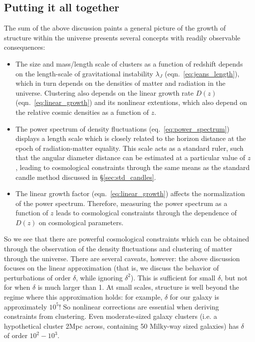 \subsection{Putting it all together}
The sum of the above discussion paints a general picture of the growth of
structure within the universe presents several concepts with readily
observable consequences:

\begin{itemize}
  \item The size and mass/length scale of clusters as a function of redshift
    depends on the length-scale of gravitational instability $\lambda_J$
    (eqn.~\ref{eq:jeans_length}),
    which in turn depends on the densities of matter and radiation in the
    universe.  Clustering also depends on the linear growth rate
    $D(z)$ (eqn.~\ref{eq:linear_growth}) and its nonlinear extentions,
    which also depend on the relative cosmic densities as a function of $z$.
  \item The power spectrum of density fluctuations (eq.~\ref{eq:power_spectrum})
    displays a length scale which is closely related to the horizon distance
    at the epoch of radiation-matter equality.  This scale acts as a standard
    ruler, such that the angular diameter distance can be estimated at a
    particular value of $z$, leading to cosmological constraints through the
    same means as the standard candle method discussed in
    \S\ref{sec:std_candles}.
  \item The linear growth factor (eqn.~\ref{eq:linear_growth}) affects the
    normalization of the power spectrum.  Therefore, measuring the power
    spectrum as a function of $z$ leads to cosmological constraints
    through the dependence of $D(z)$ on cosmological parameters.
\end{itemize}

So we see that there are powerful cosmological constraints which can be
obtained through the observation of the density fluctuations and clustering
of matter through the universe.  There are several caveats, however:
the above discussion focuses on the linear approximation (that is, we
discuss the behavior of perturbations of order $\delta$, while ignoring
$\delta^2$).  This is sufficient for small $\delta$, but not for when
$\delta$ is much larger than 1.  At small scales, structure is well beyond
the regime where this approximation holds: for example, $\delta$ for our
galaxy is approximately $10^5$!  So nonlinear corrections are essential when
deriving constraints from clustering.  Even moderate-sized galaxy clusters
(i.e. a hypothetical cluster 2Mpc across, containing 50 Milky-way
sized galaxies) has $\delta$ of order $10^2-10^3$.

